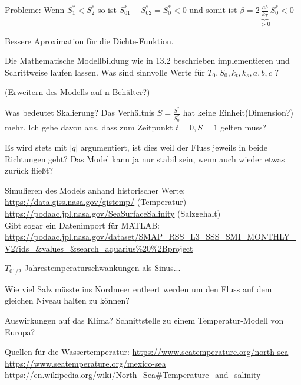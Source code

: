 \documentclass[11pt,a4paper]{article}
\begin{document}
	Probleme:
	Wenn \(S^*_1 < S^*_2\) so ist \(S^*_01 - S^*_02 = S^*_0 < 0\) und somit ist \(\beta = 2\underbrace{\frac{ab}{k_T}}_{>0}S^*_0 < 0\)

	Bessere Aproximation für die Dichte-Funktion.
	
	Die Mathematische Modellbildung wie in 13.2 beschrieben implementieren und Schrittweise laufen lassen. Was sind sinnvolle Werte für \( T_0, S_0, k_t, k_s,  a, b, c\) ?

	(Erweitern des Modells auf n-Behälter?)

	Was bedeutet Skalierung?	 Das Verhältnis \( S = \frac{S^*}{S^*_0} \) hat keine Einheit(Dimension?) mehr. Ich gehe davon aus, dass zum Zeitpunkt \( t=0, S=1 \) gelten muss?
	
	Es wird stets mit \( |q| \) argumentiert, ist dies weil der Fluss jeweils in beide Richtungen geht? Das Model kann ja nur stabil sein, wenn auch wieder etwas zurück fließt?
	
	Simulieren des Models anhand historischer Werte: \\
	\url{https://data.giss.nasa.gov/gistemp/} (Temperatur) \\
	\url{https://podaac.jpl.nasa.gov/SeaSurfaceSalinity} (Salzgehalt) \\
	Gibt sogar ein Datenimport für MATLAB: \url{https://podaac.jpl.nasa.gov/dataset/SMAP_RSS_L3_SSS_SMI_MONTHLY_V2?ids=&values=&search=aquarius%20%2Bproject}
	
	\( T_{0 1/2} \) Jahrestemperaturschwankungen als Sinus...
	
	Wie viel Salz müsste ins Nordmeer entleert werden um den Fluss auf dem gleichen Niveau halten zu können?
	
	Auswirkungen auf das Klima? Schnittstelle zu einem Temperatur-Modell von Europa?
	
	Quellen für die Wassertemperatur:
	\url{https://www.seatemperature.org/north-sea}	
	\url{https://www.seatemperature.org/mexico-sea}
	\url{https://en.wikipedia.org/wiki/North_Sea#Temperature_and_salinity}
	
\end{document}
